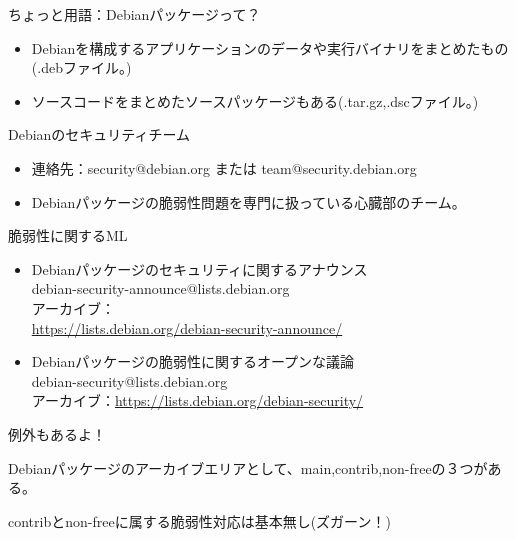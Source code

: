 \begin{frame}{ちょっと用語：Debianパッケージって？}

 \begin{itemize}
 \item Debianを構成するアプリケーションのデータや実行バイナリをまとめたもの(.debファイル。)
 \item ソースコードをまとめたソースパッケージもある(.tar.gz,.dscファイル。)
 \end{itemize}

\end{frame}

\begin{frame}{Debianのセキュリティチーム}

\begin{itemize}
\item 連絡先：security@debian.org または team@security.debian.org
\item Debianパッケージの脆弱性問題を専門に扱っている心臓部のチーム。
\end{itemize}
\end{frame}

\begin{frame}{脆弱性に関するML}

 \begin{itemize}
 \item  Debianパッケージのセキュリティに関するアナウンス\\
debian-security-announce@lists.debian.org\\
アーカイブ：\\
\url{https://lists.debian.org/debian-security-announce/}
 \item  Debianパッケージの脆弱性に関するオープンな議論\\
debian-security@lists.debian.org\\
アーカイブ：\url{https://lists.debian.org/debian-security/}
 \end{itemize}

\end{frame}

\begin{frame}{例外もあるよ！}

 Debianパッケージのアーカイブエリアとして、main,contrib,non-freeの３つがある。

\begin{center}
{\LARGE contribとnon-freeに属する脆弱性対応は基本無し(ズガーン！)}
\end{center}

\end{frame}

